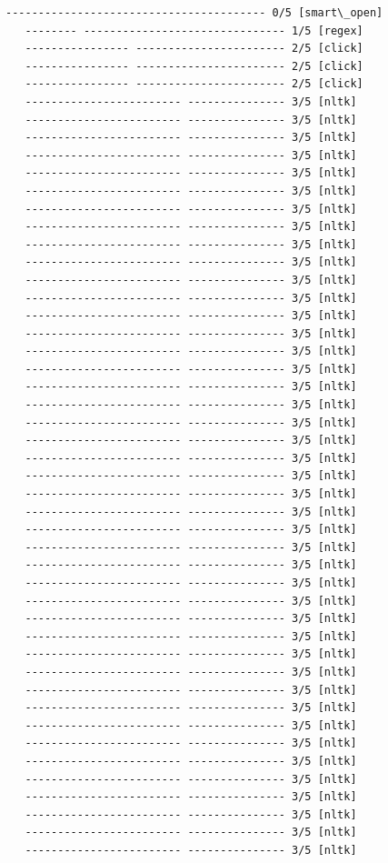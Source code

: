 \documentclass[11pt]{article}
\begin{document}
\begin{Verbatim}[commandchars=\\\{\}]
   ---------------------------------------- 0/5 [smart\_open]
   -------- ------------------------------- 1/5 [regex]
   ---------------- ----------------------- 2/5 [click]
   ---------------- ----------------------- 2/5 [click]
   ---------------- ----------------------- 2/5 [click]
   ------------------------ --------------- 3/5 [nltk]
   ------------------------ --------------- 3/5 [nltk]
   ------------------------ --------------- 3/5 [nltk]
   ------------------------ --------------- 3/5 [nltk]
   ------------------------ --------------- 3/5 [nltk]
   ------------------------ --------------- 3/5 [nltk]
   ------------------------ --------------- 3/5 [nltk]
   ------------------------ --------------- 3/5 [nltk]
   ------------------------ --------------- 3/5 [nltk]
   ------------------------ --------------- 3/5 [nltk]
   ------------------------ --------------- 3/5 [nltk]
   ------------------------ --------------- 3/5 [nltk]
   ------------------------ --------------- 3/5 [nltk]
   ------------------------ --------------- 3/5 [nltk]
   ------------------------ --------------- 3/5 [nltk]
   ------------------------ --------------- 3/5 [nltk]
   ------------------------ --------------- 3/5 [nltk]
   ------------------------ --------------- 3/5 [nltk]
   ------------------------ --------------- 3/5 [nltk]
   ------------------------ --------------- 3/5 [nltk]
   ------------------------ --------------- 3/5 [nltk]
   ------------------------ --------------- 3/5 [nltk]
   ------------------------ --------------- 3/5 [nltk]
   ------------------------ --------------- 3/5 [nltk]
   ------------------------ --------------- 3/5 [nltk]
   ------------------------ --------------- 3/5 [nltk]
   ------------------------ --------------- 3/5 [nltk]
   ------------------------ --------------- 3/5 [nltk]
   ------------------------ --------------- 3/5 [nltk]
   ------------------------ --------------- 3/5 [nltk]
   ------------------------ --------------- 3/5 [nltk]
   ------------------------ --------------- 3/5 [nltk]
   ------------------------ --------------- 3/5 [nltk]
   ------------------------ --------------- 3/5 [nltk]
   ------------------------ --------------- 3/5 [nltk]
   ------------------------ --------------- 3/5 [nltk]
   ------------------------ --------------- 3/5 [nltk]
   ------------------------ --------------- 3/5 [nltk]
   ------------------------ --------------- 3/5 [nltk]
   ------------------------ --------------- 3/5 [nltk]
   ------------------------ --------------- 3/5 [nltk]
   ------------------------ --------------- 3/5 [nltk]
   ------------------------ --------------- 3/5 [nltk]

\end{Verbatim}
\end{document}
